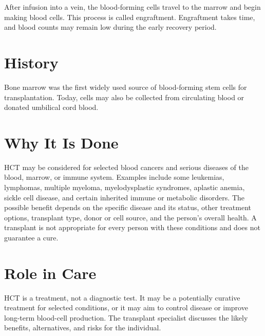 After infusion into a vein, the blood-forming cells travel to the marrow and begin making blood cells. This process is called engraftment. Engraftment takes time, and blood counts may remain low during the early recovery period.

\section*{History}
Bone marrow was the first widely used source of blood-forming stem cells for transplantation. Today, cells may also be collected from circulating blood or donated umbilical cord blood.

\section*{Why It Is Done}
HCT may be considered for selected blood cancers and serious diseases of the blood, marrow, or immune system. Examples include some leukemias, lymphomas, multiple myeloma, myelodysplastic syndromes, aplastic anemia, sickle cell disease, and certain inherited immune or metabolic disorders. The possible benefit depends on the specific disease and its status, other treatment options, transplant type, donor or cell source, and the person's overall health. A transplant is not appropriate for every person with these conditions and does not guarantee a cure.

\section*{Role in Care}
HCT is a treatment, not a diagnostic test. It may be a potentially curative treatment for selected conditions, or it may aim to control disease or improve long-term blood-cell production. The transplant specialist discusses the likely benefits, alternatives, and risks for the individual.

